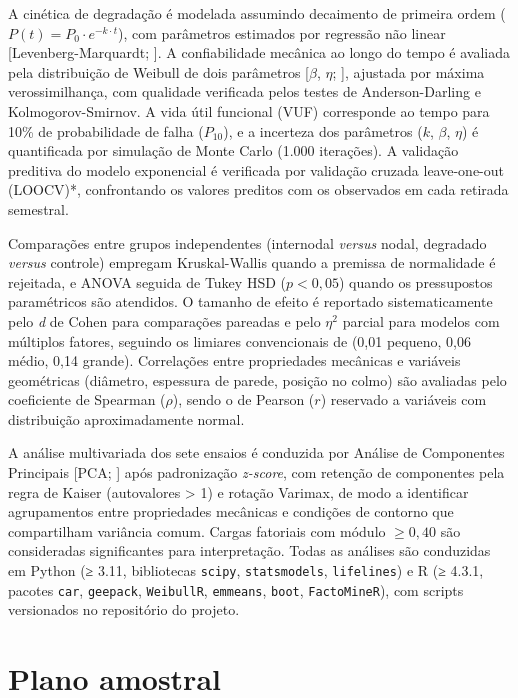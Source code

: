 \documentclass[
  brazilian,
  authoryear,
  preprint]{elsarticle}
\begin{document}
A cinética de degradação é modelada assumindo decaimento de primeira
ordem (\(P(t) = P_0 \cdot e^{-k \cdot t}\)), com parâmetros estimados
por regressão não linear {[}Levenberg-Marquardt;
\citet{marquardt_1963}{]}. A confiabilidade mecânica ao longo do tempo é
avaliada pela distribuição de Weibull de dois parâmetros {[}\(\beta\),
\(\eta\); \citet{weibull_1951}{]}, ajustada por máxima verossimilhança,
com qualidade verificada pelos testes de Anderson-Darling e
Kolmogorov-Smirnov. A vida útil funcional (VUF) corresponde ao tempo
para 10\% de probabilidade de falha (\(P_{10}\)), e a incerteza dos
parâmetros (\(k\), \(\beta\), \(\eta\)) é quantificada por simulação de
Monte Carlo (1.000 iterações). A validação preditiva do modelo
exponencial é verificada por validação cruzada leave-one-out (LOOCV)*,
confrontando os valores preditos com os observados em cada retirada
semestral.

Comparações entre grupos independentes (internodal \emph{versus} nodal,
degradado \emph{versus} controle) empregam Kruskal-Wallis quando a
premissa de normalidade é rejeitada, e ANOVA seguida de Tukey HSD
(\(p < 0{,}05\)) quando os pressupostos paramétricos são atendidos. O
tamanho de efeito é reportado sistematicamente pelo \emph{d} de Cohen
para comparações pareadas e pelo \(\eta^2\) parcial para modelos com
múltiplos fatores, seguindo os limiares convencionais de
\citet{cohen_1988} (0,01 pequeno, 0,06 médio, 0,14 grande). Correlações
entre propriedades mecânicas e variáveis geométricas (diâmetro,
espessura de parede, posição no colmo) são avaliadas pelo coeficiente de
Spearman (\(\rho\)), sendo o de Pearson (\(r\)) reservado a variáveis
com distribuição aproximadamente normal.

A análise multivariada dos sete ensaios é conduzida por Análise de
Componentes Principais {[}PCA; \citet{jolliffe_2002}{]} após
padronização \emph{z-score}, com retenção de componentes pela regra de
Kaiser (autovalores \textgreater{} 1) e rotação Varimax, de modo a
identificar agrupamentos entre propriedades mecânicas e condições de
contorno que compartilham variância comum. Cargas fatoriais com módulo
\(\geq 0{,}40\) são consideradas significantes para interpretação. Todas
as análises são conduzidas em Python (≥ 3.11, bibliotecas
\texttt{scipy}, \texttt{statsmodels}, \texttt{lifelines}) e R (≥ 4.3.1,
pacotes \texttt{car}, \texttt{geepack}, \texttt{WeibullR},
\texttt{emmeans}, \texttt{boot}, \texttt{FactoMineR}), com scripts
versionados no repositório do projeto.

\section{Plano amostral}\label{plano-amostral}
\end{document}
